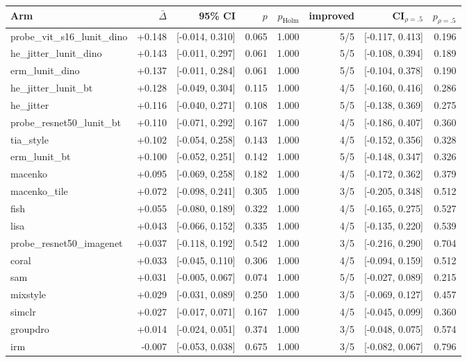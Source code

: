 \begin{tabular}{lrrrrrrr}
\toprule
Arm & $\bar\Delta$ & 95\% CI & $p$ & $p_\text{Holm}$ & improved & CI$_{\rho=.5}$ & $p_{\rho=.5}$ \\
\midrule
probe\_vit\_s16\_lunit\_dino & +0.148 & [-0.014, 0.310] & 0.065 & 1.000 & 5/5 & [-0.117, 0.413] & 0.196 \\
he\_jitter\_lunit\_dino & +0.143 & [-0.011, 0.297] & 0.061 & 1.000 & 5/5 & [-0.108, 0.394] & 0.189 \\
erm\_lunit\_dino & +0.137 & [-0.011, 0.284] & 0.061 & 1.000 & 5/5 & [-0.104, 0.378] & 0.190 \\
he\_jitter\_lunit\_bt & +0.128 & [-0.049, 0.304] & 0.115 & 1.000 & 4/5 & [-0.160, 0.416] & 0.286 \\
he\_jitter & +0.116 & [-0.040, 0.271] & 0.108 & 1.000 & 5/5 & [-0.138, 0.369] & 0.275 \\
probe\_resnet50\_lunit\_bt & +0.110 & [-0.071, 0.292] & 0.167 & 1.000 & 4/5 & [-0.186, 0.407] & 0.360 \\
tia\_style & +0.102 & [-0.054, 0.258] & 0.143 & 1.000 & 4/5 & [-0.152, 0.356] & 0.328 \\
erm\_lunit\_bt & +0.100 & [-0.052, 0.251] & 0.142 & 1.000 & 5/5 & [-0.148, 0.347] & 0.326 \\
macenko & +0.095 & [-0.069, 0.258] & 0.182 & 1.000 & 4/5 & [-0.172, 0.362] & 0.379 \\
macenko\_tile & +0.072 & [-0.098, 0.241] & 0.305 & 1.000 & 3/5 & [-0.205, 0.348] & 0.512 \\
fish & +0.055 & [-0.080, 0.189] & 0.322 & 1.000 & 4/5 & [-0.165, 0.275] & 0.527 \\
lisa & +0.043 & [-0.066, 0.152] & 0.335 & 1.000 & 4/5 & [-0.135, 0.220] & 0.539 \\
probe\_resnet50\_imagenet & +0.037 & [-0.118, 0.192] & 0.542 & 1.000 & 3/5 & [-0.216, 0.290] & 0.704 \\
coral & +0.033 & [-0.045, 0.110] & 0.306 & 1.000 & 4/5 & [-0.094, 0.159] & 0.512 \\
sam & +0.031 & [-0.005, 0.067] & 0.074 & 1.000 & 5/5 & [-0.027, 0.089] & 0.215 \\
mixstyle & +0.029 & [-0.031, 0.089] & 0.250 & 1.000 & 3/5 & [-0.069, 0.127] & 0.457 \\
simclr & +0.027 & [-0.017, 0.071] & 0.167 & 1.000 & 4/5 & [-0.045, 0.099] & 0.360 \\
groupdro & +0.014 & [-0.024, 0.051] & 0.374 & 1.000 & 3/5 & [-0.048, 0.075] & 0.574 \\
irm & -0.007 & [-0.053, 0.038] & 0.675 & 1.000 & 3/5 & [-0.082, 0.067] & 0.796 \\
\bottomrule
\end{tabular}
